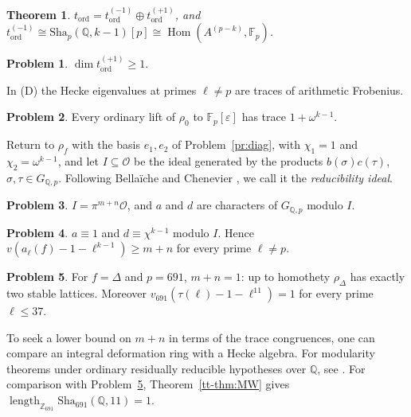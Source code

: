 \documentclass[reqno]{amsart}
\theoremstyle{definition}
\newtheorem{problem}{Problem}[section]
\theoremstyle{plain}
\newtheorem{theorem}{Theorem}[section]
\newcommand{\Z}{\mathbb{Z}}
\newcommand{\Q}{\mathbb{Q}}
\newcommand{\F}{\mathbb{F}}
\newcommand{\Oc}{\mathcal{O}}
\newcommand{\Hom}{\operatorname{Hom}}
\newcommand{\Sha}{\mathrm{Sha}}
\newcommand{\GQ}{G_{\Q,p}}
\begin{document}
\begin{theorem}\label{thm:tangent}
\(t_{\mathrm{ord}} = t_{\mathrm{ord}}^{(-1)} \oplus t_{\mathrm{ord}}^{(+1)}\), and \(t_{\mathrm{ord}}^{(-1)} \cong \Sha_p(\Q, k-1)[p] \cong \Hom(A^{(p-k)}, \F_p)\).
\end{theorem}

\begin{problem}\label{pr:plus-side}
\(\dim t_{\mathrm{ord}}^{(+1)} \ge 1\).
\end{problem}

In (D) the Hecke eigenvalues at primes \(\ell\ne p\) are traces of arithmetic Frobenius.

\begin{problem}\label{pr:trace-blind}
Every ordinary lift of \(\rho_0\) to \(\F_p[\varepsilon]\) has trace \(1 + \omega^{k-1}\).
\end{problem}

Return to \(\rho_f\) with the basis \(e_1, e_2\) of Problem~\ref{pr:diag}, with \(\chi_1 = 1\) and \(\chi_2 = \omega^{k-1}\), and let \(I \subseteq \Oc\) be the ideal generated by the products \(b(\sigma)c(\tau)\), \(\sigma, \tau \in \GQ\).  Following Bellaïche and Chenevier \cite[Ch.~1]{BC}, we call it the \emph{reducibility ideal}.

\begin{problem}\label{pr:red-ideal}
\(I = \pi^{m+n}\Oc\), and \(a\) and \(d\) are characters of \(\GQ\) modulo \(I\).
\end{problem}

\begin{problem}\label{pr:trace-cong}
\(a \equiv 1\) and \(d \equiv \chi^{k-1}\) modulo \(I\).  Hence \(v(a_\ell(f) - 1 - \ell^{k-1}) \ge m + n\) for every prime \(\ell \ne p\).
\end{problem}

\begin{problem}\label{pr:691-segment}
For \(f = \Delta\) and \(p = 691\), \(m + n = 1\): up to homothety \(\rho_\Delta\) has exactly two stable lattices.  Moreover \(v_{691}(\tau(\ell) - 1 - \ell^{11}) = 1\) for every prime \(\ell \le 37\).
\end{problem}

To seek a lower bound on \(m+n\) in terms of the trace congruences, one can compare an integral deformation ring with a Hecke algebra.  For modularity theorems under ordinary residually reducible hypotheses over \(\Q\), see \cite{SW}.  For comparison with Problem~\ref{pr:691-segment}, Theorem~\ref{tt-thm:MW} gives \(\operatorname{length}_{\Z_{691}}\Sha_{691}(\Q,11)=1\).
\end{document}
